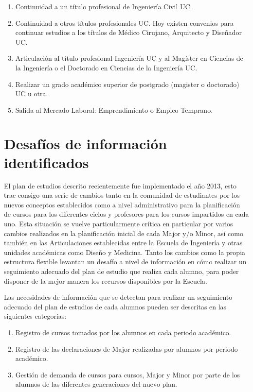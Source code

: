 \begin{enumerate}
  \item Continuidad a un título profesional de Ingeniería Civil UC.
  \item Continuidad a otros títulos profesionales UC. Hoy existen convenios para continuar estudios a los títulos de Médico Cirujano, Arquitecto y Diseñador UC.
  \item Articulación al título profesional Ingeniería UC y al Magíster en Ciencias de la Ingeniería o el Doctorado en Ciencias de la Ingeniería UC.
  \item Realizar un grado académico superior de postgrado (magister o doctorado) UC u otra.
  \item Salida al Mercado Laboral: Emprendimiento o Empleo Temprano.
\end{enumerate}

\section{Desafíos de información identificados \label{sec:challenges}}

El plan de estudios descrito recientemente fue implementado el año 2013, esto trae consigo una serie de cambios tanto en la comunidad de estudiantes por los nuevos conceptos establecidos como a nivel administrativo para la planificación de cursos para los diferentes ciclos y profesores para los cursos impartidos en cada uno. Esta situación se vuelve particularmente crítica en particular por varios cambios realizados en la planificación inicial de cada Major y/o Minor, así como también en las Articulaciones establecidas entre la Escuela de Ingeniería y otras unidades académicas como Diseño y Medicina. Tanto los cambios como la propia estructura flexible levantan un desafío a nivel de información en cómo realizar un seguimiento adecuado del plan de estudio que realiza cada alumno, para poder disponer de la mejor manera los recursos disponibles por la Escuela.

Las necesidades de información que se detectan para realizar un seguimiento adecuado del plan de estudios de cada alumnos pueden ser descritas en las siguientes categorías:

\begin{enumerate}
  \item Registro de cursos tomados por los alumnos en cada periodo académico.
  \item Registro de las declaraciones de Major realizadas por alumnos por periodo académico.
  \item Gestión de demanda de cursos para cursos, Major y Minor por parte de los alumnos de las diferentes generaciones del nuevo plan.
\end{enumerate}
